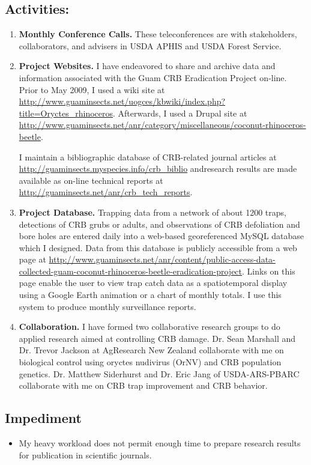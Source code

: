\documentclass[12pt,oneside,english]{scrbook}
\begin{document}
\subsection{Activities:}
\begin{enumerate}

\item \textbf{Monthly Conference Calls.} These teleconferences are with stakeholders, collaborators,
and advisers in USDA APHIS and USDA Forest Service. 

\item \textbf{Project Websites. }I have endeavored to share and archive
data and information associated with the Guam CRB Eradication Project
on-line. Prior to May 2009, I used a wiki site at \url{http://www.guaminsects.net/uogces/kbwiki/index.php?title=Oryctes_rhinoceros}.
Afterwards, I used a Drupal site at \url{http://www.guaminsects.net/anr/category/miscellaneous/coconut-rhinoceros-beetle}.

I maintain a bibliographic database of CRB-related journal articles at \url{http://guaminsects.myspecies.info/crb_biblio} andresearch results are made available as on-line technical reports at \url{http://guaminsects.net/anr/crb_tech_reports}.

\item \textbf{Project Database. }Trapping data from a network of about 1200
traps, detections of CRB grubs or adults, and observations of CRB
defoliation and bore holes are entered daily into a web-based georeferenced
MySQL database which I designed. Data from this database is publicly
accessible from a web page at \url{http://www.guaminsects.net/anr/content/public-access-data-collected-guam-coconut-rhinoceros-beetle-eradication-project}.
Links on this page enable the user to view trap catch data as a spatiotemporal
display using a Google Earth animation or a chart of monthly totals.
I use this system to produce monthly surveillance reports. 

\item \textbf{Collaboration.} I have formed two collaborative research groups
to do applied research aimed at controlling CRB damage. Dr. Sean Marshall
and Dr. Trevor Jackson at AgResearch New Zealand collaborate with
me on biological control using oryctes nudivirus (OrNV) and CRB population
genetics. Dr. Matthew Siderhurst and Dr. Eric Jang of USDA-ARS-PBARC
collaborate with me on CRB trap improvement and CRB behavior. 
\end{enumerate}

\subsection{Impediment}
\begin{itemize}
\item My heavy workload does not permit enough time to prepare research
results for publication in scientific journals.
\end{itemize}
\end{document}
